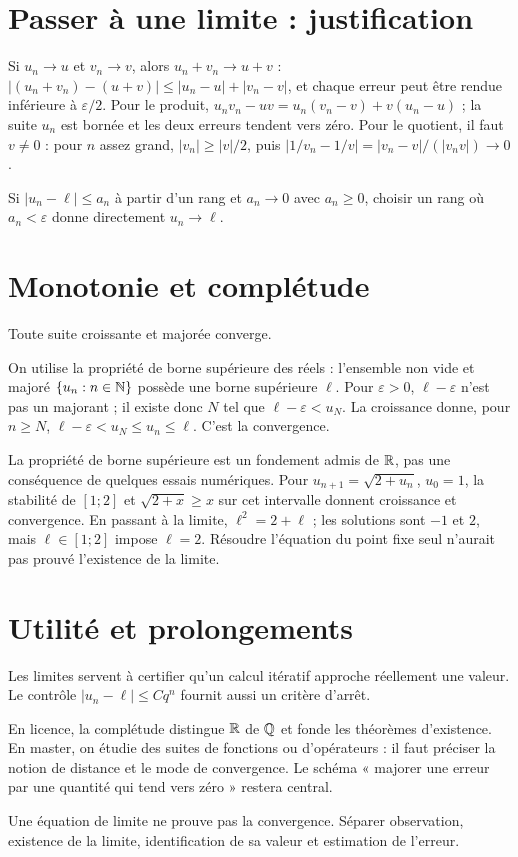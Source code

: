 \documentclass[../cours_1re.tex]{subfiles}
\begin{document}
\section{Passer à une limite : justification}
\approfondissement Si $u_n\to u$ et $v_n\to v$, alors $u_n+v_n\to u+v$ :
$|(u_n+v_n)-(u+v)|\le|u_n-u|+|v_n-v|$, et chaque erreur peut être rendue inférieure à $\varepsilon/2$.
Pour le produit,
$u_nv_n-uv=u_n(v_n-v)+v(u_n-u)$ ; la suite $u_n$ est bornée et les deux erreurs tendent vers zéro.
Pour le quotient, il faut $v\ne0$ : pour $n$ assez grand, $|v_n|\ge|v|/2$, puis
$|1/v_n-1/v|=|v_n-v|/(|v_nv|)\to0$.
\begin{demonstration}[Encadrement]
Si $|u_n-\ell|\le a_n$ à partir d'un rang et $a_n\to0$ avec $a_n\ge0$, choisir un rang où $a_n<\varepsilon$ donne directement $u_n\to\ell$.
\end{demonstration}
\begin{finchapitre}
\section{Monotonie et complétude}
\begin{theoreme}[Complément]
Toute suite croissante et majorée converge.
\end{theoreme}
\begin{demonstration}
On utilise la propriété de borne supérieure des réels : l'ensemble non vide et majoré $\{u_n:n\in\mathbb{N}\}$ possède une borne supérieure $\ell$. Pour $\varepsilon>0$, $\ell-\varepsilon$ n'est pas un majorant ; il existe donc $N$ tel que $\ell-\varepsilon<u_N$. La croissance donne, pour $n\ge N$,
$\ell-\varepsilon<u_N\le u_n\le\ell$. C'est la convergence.
\end{demonstration}
La propriété de borne supérieure est un fondement admis de $\mathbb{R}$, pas une conséquence de quelques essais numériques.
Pour $u_{n+1}=\sqrt{2+u_n}$, $u_0=1$, la stabilité de $[1;2]$ et
$\sqrt{2+x}\ge x$ sur cet intervalle donnent croissance et convergence. En passant à la limite, $\ell^2=2+\ell$ ; les solutions sont $-1$ et $2$, mais $\ell\in[1;2]$ impose $\ell=2$.
Résoudre l'équation du point fixe seul n'aurait pas prouvé l'existence de la limite.


\section{Utilité et prolongements}
Les limites servent à certifier qu'un calcul itératif approche réellement une valeur. Le contrôle $|u_n-\ell|\le Cq^n$ fournit aussi un critère d'arrêt.

En licence, la complétude distingue $\mathbb{R}$ de $\mathbb{Q}$ et fonde les théorèmes d'existence. En master, on étudie des suites de fonctions ou d'opérateurs : il faut préciser la notion de distance et le mode de convergence. Le schéma « majorer une erreur par une quantité qui tend vers zéro » restera central.
\begin{retenir}
Une équation de limite ne prouve pas la convergence. Séparer observation, existence de la limite, identification de sa valeur et estimation de l'erreur.
\end{retenir}
\end{finchapitre}
\end{document}
